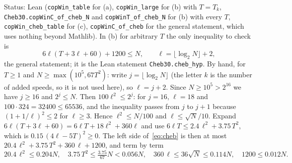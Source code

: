 \documentclass[11pt]{article}
\theoremstyle{definition}
\theoremstyle{remark}
\begin{document}
{\sloppy Status: Lean (\texttt{copWin\_table} for (a), \texttt{copWin\_large} for (b) with $T=T_k$, \texttt{Cheb30.copWinC\_of\_cheb\_N} and \texttt{copWinT\_of\_cheb\_N} for (b) with every $T$, \texttt{copWin\_cheb\_table} for (c), \texttt{copWinC\_of\_cheb} for the general statement, which uses nothing beyond Mathlib). In (b) for arbitrary $T$ the only inequality to check is
\begin{equation}\label{eq:cheb}
6\ell(T+3\ell+60)+1200\le N,\qquad\ell=\lfloor\log_2N\rfloor+2,
\end{equation}
the general statement; it is the Lean statement \texttt{Cheb30.cheb\_hyp}. By hand, for $T\ge1$ and $N\ge\max(10^5,67T^2)$: write $j=\lfloor\log_2N\rfloor$ (the letter $k$ is the number of added speeds, so it is not used here), so $\ell=j+2$. Since $N\ge10^5>2^{16}$ we have $j\ge16$ and $2^j\le N$. Then $100\ell^2\le2^j$: for $j=16$, $\ell=18$ and $100\cdot324=32400\le65536$, and the inequality passes from $j$ to $j+1$ because $(1+1/\ell)^2\le2$ for $\ell\ge3$. Hence $\ell^2\le N/100$ and $\ell\le\sqrt N/10$. Expand $6\ell(T+3\ell+60)=6\ell T+18\ell^2+360\ell$ and use $6\ell T\le2.4\,\ell^2+3.75\,T^2$, which is $0.15\,(4\ell-5T)^2\ge0$. The left side of~\eqref{eq:cheb} is then at most $20.4\,\ell^2+3.75\,T^2+360\,\ell+1200$, and term by term
\[
20.4\,\ell^2\le0.204N,\quad 3.75\,T^2\le\tfrac{3.75}{67}N<0.056N,\quad 360\,\ell\le36\sqrt N\le0.114N,\quad 1200\le0.012N .
\]
}
\end{document}
